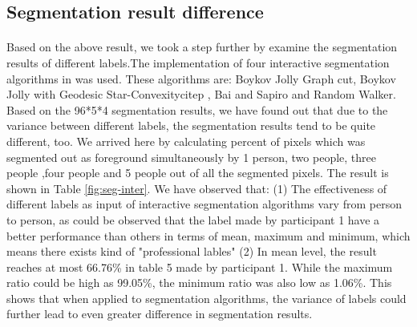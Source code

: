 \documentclass[runningheads,a4paper]{llncs}
\begin{document}
\subsection{Segmentation result difference}
\paragraph{}Based on the above result, we took a step further by examine the segmentation results of different labels.The implementation of four interactive segmentation algorithms in \citep{gulshan2010geodesic} was used. These algorithms are: Boykov Jolly Graph cut\citep{boykov2001interactive},  Boykov Jolly with Geodesic Star-Convexitycitep\citep{gulshan2010geodesic} , Bai and Sapiro\citep{bai2007geodesic} and Random Walker\citep {grady2006random}. Based on the 96*5*4 segmentation results, we have found out that due to the variance between different labels, the segmentation results tend to be quite different, too.  We arrived here by calculating percent of pixels which was segmented out as foreground simultaneously by 1 person, two people, three people ,four people and 5 people out of all the segmented pixels. The result is shown in Table \ref{fig:seg-inter}. We have observed that: (1) The effectiveness of different labels as input of interactive segmentation algorithms vary from person to person, as could be observed that the label made by participant 1 have a better performance than others in terms of mean, maximum and minimum, which means there exists kind of "professional lables" \citep{fu2008saliency} (2) In mean level, the result reaches at most 66.76\% in table 5 made by participant 1. While the maximum ratio could be high as 99.05\%, the minimum ratio was also low as 1.06\%. This shows that when applied to segmentation algorithms, the variance of labels could further lead to even greater difference in segmentation results.
\end{document}

